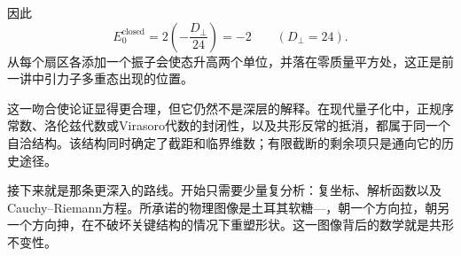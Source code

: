 因此
\begin{equation}
  E_0^{\mathrm{closed}}
  =
  2\left(-\frac{D_\perp}{24}\right)
  =-2
  \qquad (D_\perp=24).
\end{equation}
从每个扇区各添加一个振子会使态升高两个单位，并落在零质量平方处，这正是前一讲中引力子多重态出现的位置。

这一吻合使论证显得更合理，但它仍然不是深层的解释。在现代量子化中，正规序常数、洛伦兹代数或Virasoro代数的封闭性，以及共形反常的抵消，都属于同一个自洽结构。该结构同时确定了截距和临界维数；有限截断的剩余项只是通向它的历史途径。

接下来就是那条更深入的路线。开始只需要少量复分析：复坐标、解析函数以及Cauchy--Riemann方程。所承诺的物理图像是土耳其软糖---，朝一个方向拉，朝另一个方向抻，在不破坏关键结构的情况下重塑形状。这一图像背后的数学就是共形不变性。
